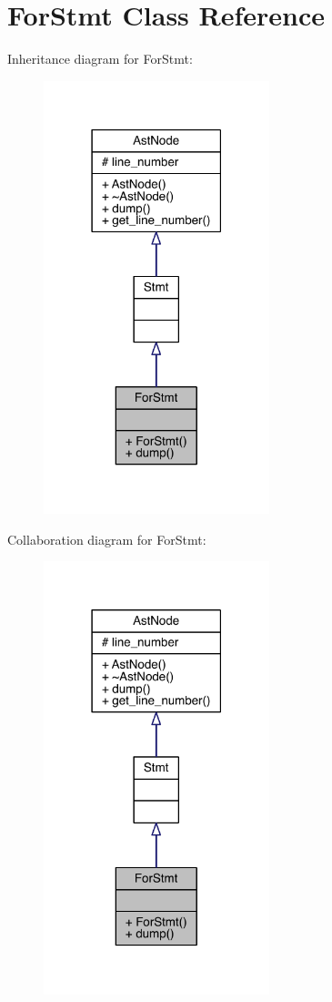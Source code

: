 \hypertarget{class_for_stmt}{}\section{For\+Stmt Class Reference}
\label{class_for_stmt}


Inheritance diagram for For\+Stmt\+:\nopagebreak
\begin{figure}[H]
\begin{center}
\leavevmode
\includegraphics[width=186pt]{class_for_stmt__inherit__graph}
\end{center}
\end{figure}


Collaboration diagram for For\+Stmt\+:\nopagebreak
\begin{figure}[H]
\begin{center}
\leavevmode
\includegraphics[width=186pt]{class_for_stmt__coll__graph}
\end{center}
\end{figure}

